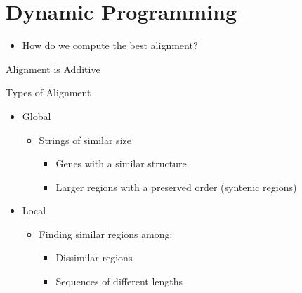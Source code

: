 \documentclass{bredelebeamer}
\begin{document}
 \section{Dynamic Programming}
  \begin{frame}{}
    \tableofcontents[currentsection]
\end{frame}
 \begin{frame}{}
    \large{
    \begin{itemize}
 \item How do we compute the best alignment?
   \end{itemize} 
   
    }  
 \end{frame}
  \begin{frame}{Alignment is Additive}
   
 \end{frame}
 \begin{frame}{Types of Alignment}
    \begin{itemize}
 \item Global
          \begin{itemize}
     \item Strings of similar size
      \begin{itemize}
     \item Genes with a similar structure
     \item Larger regions with a preserved order (syntenic
regions)
   \end{itemize} 
   \end{itemize} 
   \item Local
    \begin{itemize}
     \item Finding similar regions among:
      \begin{itemize}
     \item Dissimilar regions
     \item Sequences of different lengths
   \end{itemize} 
   \end{itemize}
   \end{itemize}  
 \end{frame}
\end{document}
